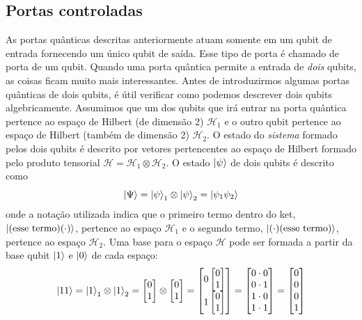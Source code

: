 \documentclass{article}
\begin{document}
\subsection{Portas controladas}

As portas quânticas descritas anteriormente atuam somente em um qubit de entrada fornecendo um único qubit de saída. Esse tipo de porta é chamado de porta de um qubit. Quando uma porta quântica permite a entrada de \textit{dois} qubits, as coisas ficam muito mais interessantes. Antes de introduzirmos algumas portas quânticas de dois qubits, é útil verificar como podemos descrever dois qubits algebricamente. Assumimos que um dos qubits que irá entrar na porta quântica pertence ao espaço de Hilbert (de dimensão 2) $\mathcal{H}_1$ e o outro qubit pertence ao espaço de Hilbert (também de dimensão 2) $\mathcal{H}_2$. O estado do \textit{sistema} formado pelos dois qubits é descrito por vetores pertencentes ao espaço de Hilbert formado pelo produto tensorial $\mathcal{H} = \mathcal{H}_1 \otimes \mathcal{H}_2$. O estado $\ket{\psi}$ de dois qubits é descrito como
\begin{equation}
    \ket{\Psi} = \ket{\psi}_1 \otimes \ket{\psi}_2 = \ket{\psi_1 \psi_2}
\end{equation}
onde a notação utilizada indica que o primeiro termo dentro do ket, $\ket{(\text{esse termo})(\cdot)}$, pertence ao espaço $\mathcal{H}_1$ e o segundo termo, $\ket{(\cdot)(\text{esse termo})}$, pertence ao espaço $\mathcal{H}_2$. Uma base para o espaço $\mathcal{H}$ pode ser formada a partir da base qubit $\ket{1}$ e $\ket{0}$ de cada espaço:
\begin{equation}
    \ket{11} = \ket{1}_1 \otimes \ket{1}_2 = 
    \begin{bmatrix}
    0\\
    1
    \end{bmatrix}
    \otimes\begin{bmatrix}
    0\\
    1
    \end{bmatrix} = 
    \begin{bmatrix}
    0\begin{bmatrix}
    0\\
    1
    \end{bmatrix}\\
    1\begin{bmatrix}
    0\\
    1
    \end{bmatrix}
    \end{bmatrix} = \begin{bmatrix}
    0 \cdot 0\\
    0 \cdot 1\\
    1 \cdot 0\\
    1 \cdot 1\\
    \end{bmatrix} = \begin{bmatrix}
    0\\
    0\\
    0\\
    1\\
    \end{bmatrix}
\end{equation}
\end{document}

